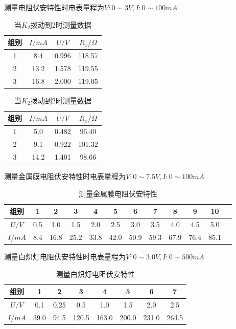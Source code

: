 \documentclass[UTF8]{ctexart}
\begin{document}
测量电阻伏安特性时电表量程为$V:0 \sim 3V,I:0 \sim 100 mA$
\begin{table}[H]
\centering
\caption{测量电阻的伏安特性}
\begin{minipage}{0.47\linewidth}
\centering
\caption*{当$K_2$拨动到1时测量数据}
\begin{tabular}{|c|c|c|c|}
    \hline
     组别 & $I/mA$  & $U/V$   & $R_x/\Omega$\\
    \hline
     1  &    8.4  &   0.996   &  118.57  \\
    \hline
     2  &   13.2  &   1.578  &    119.55  \\
    \hline
     3  &   16.8  &   2.000  &   119.05  \\
    \hline
     \end{tabular}
\end{minipage}%
\hspace{0.05\linewidth} %
\begin{minipage}{0.46\linewidth}
\centering
\caption*{当$K_2$拨动到2时测量数据}
\begin{tabular}{|c|c|c|c|}
    \hline
     组别 & $I/mA$  & $U/V$   & $R_x/\Omega$\\
    \hline
     1  &   5.0  &   0.482  &  96.40 \\
    \hline
     2  &   9.1  &   0.922  &  101.32  \\
    \hline
     3  &   14.2  &   1.401  &   98.66  \\
    \hline
     \end{tabular}
\end{minipage}
\end{table}

测量金属膜电阻伏安特性时电表量程为$V:0 \sim 7.5V,I:0 \sim 100 mA$
\begin{table}[H]
    \centering
    \caption{测量金属膜电阻伏安特性}
    \begin{tabular}{|c|c|c|c|c|c|c|c|c|c|c|c|}
    \hline
      组别   & 1 & 2 & 3 & 4 & 5 & 6 & 7 & 8 & 9 & 10 \\
    \hline
       $U/V$  & 0.5  &  1.0  &  1.5  &   2.0  &  2.5  &  3.0  & 3.5  &  4.0  & 4.5  & 5.0           \\
    \hline
       $I/mA$ &  8.4  &   16.8  &  25.2  &   33.8   &   42.0   &   50.9  &  59.3  &  67.9  &  76.4  &  85.1  \\
    \hline
    \end{tabular}
\end{table}

测量白炽灯电阻伏安特性时电表量程为$V:0 \sim 3.0V,I:0 \sim 500 mA$
\begin{table}[H]
    \centering
    \caption{测量白炽灯电阻伏安特性}
    \begin{tabular}{|c|c|c|c|c|c|c|c|}
    \hline
      组别   & 1 & 2 & 3 & 4 & 5 & 6 & 7  \\
    \hline
       $U/V$  &  0.1  &  0.25  &  0.5  &  1.0  &  1.5  & 2.0  & 2.5          \\
    \hline
       $I/mA$ &  39.0  &   94.5  &   120.5   &   163.0  &   200.0  &   231.0  &  264.5   \\
    \hline
    \end{tabular}
\end{table}
\end{document}
